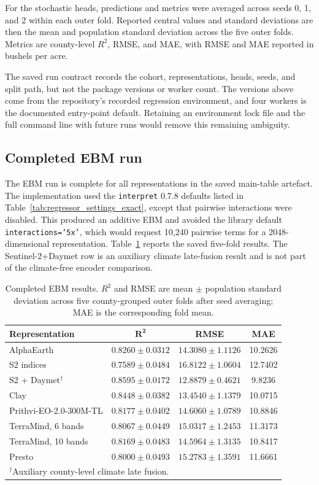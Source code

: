 For the stochastic heads, predictions and metrics were averaged across seeds
0, 1, and 2 within each outer fold.  Reported central values and standard
deviations are then the mean and population standard deviation across the five
outer folds.  Metrics are county-level $R^2$, RMSE, and MAE, with RMSE and MAE
reported in bushels per acre.

The saved run contract records the cohort, representations, heads, seeds, and
split path, but not the package versions or worker count.  The versions above
come from the repository's recorded regression environment, and four workers
is the documented entry-point default.  Retaining an environment lock file and
the full command line with future runs would remove this remaining ambiguity.

\subsection{Completed EBM run}

The EBM run is complete for all representations in the saved main-table
artefact.  The implementation used the \texttt{interpret} 0.7.8 defaults listed
in Table~\ref{tab:regressor_settings_exact}, except that pairwise interactions
were disabled.  This produced an additive EBM and avoided the library default
\texttt{interactions='5x'}, which would request 10,240 pairwise terms for a
2048-dimensional representation.  Table~\ref{tab:ebm_completed} reports the
saved five-fold results.  The Sentinel-2+Daymet row is an auxiliary climate
late-fusion result and is not part of the climate-free encoder comparison.

\begin{table}[t]
\centering
\caption{Completed EBM results.  $R^2$ and RMSE are mean $\pm$ population
standard deviation across five county-grouped outer folds after seed averaging;
MAE is the corresponding fold mean.}
\label{tab:ebm_completed}
\scriptsize
\setlength{\tabcolsep}{3.2pt}
\renewcommand{\arraystretch}{1.08}
\begin{tabular}{lccc}
\toprule
\textbf{Representation} & $\mathbf{R^2}$ & \textbf{RMSE} & \textbf{MAE} \\
\midrule
AlphaEarth & $0.8260\pm0.0312$ & $14.3080\pm1.1126$ & 10.2626 \\
S2 indices & $0.7589\pm0.0484$ & $16.8122\pm1.0604$ & 12.7402 \\
S2 + Daymet$^{\dagger}$ & $0.8595\pm0.0172$ & $12.8879\pm0.4621$ & 9.8236 \\
Clay & $0.8448\pm0.0382$ & $13.4540\pm1.1379$ & 10.0715 \\
Prithvi-EO-2.0-300M-TL & $0.8177\pm0.0402$ & $14.6060\pm1.0789$ & 10.8846 \\
TerraMind, 6 bands & $0.8067\pm0.0449$ & $15.0317\pm1.2453$ & 11.3173 \\
TerraMind, 10 bands & $0.8169\pm0.0483$ & $14.5964\pm1.3135$ & 10.8417 \\
Presto & $0.8000\pm0.0493$ & $15.2783\pm1.3591$ & 11.6661 \\
\bottomrule
\multicolumn{4}{l}{\scriptsize $^{\dagger}$Auxiliary county-level climate late fusion.}
\end{tabular}
\end{table}

